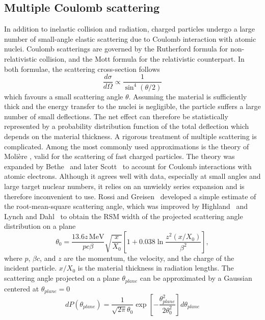 \subsection{Multiple Coulomb scattering}\label{subsect:multi-scat}

In addition to inelastic collision and radiation, charged particles undergo a large number of small-angle elastic scattering due to Coulomb interaction with atomic nuclei. 
Coulomb scatterings are governed by the Rutherford formula for non-relativistic collision, and the Mott formula for the relativistic counterpart. 
In both formulae, the scattering cross-section follows 
\begin{equation}
    \label{eq:6.13}
    \frac{d\sigma}{d\Omega} \propto \frac{1}{\sin^4 (\theta/2)}
\end{equation}
which favours a small scattering angle $\theta$. Assuming the material is sufficiently thick and the energy transfer to the nuclei is negligible, the particle suffers a large number of small deflections.
The net effect can therefore be statistically represented by a probability distribution function of the total deflection which depends on the material thickness. 
A rigorous treatment of multiple scattering is complicated. 
Among the most commonly used approximations is the theory of Molière \cite{Moliere:1947, Moliere:1948zz}, valid for the scattering of fast charged particles. 
The theory was expanded by Bethe~\cite{bethe:1953} and later Scott~\cite{scott:1963} to account for Coulomb interactions with atomic electrons. 
Although it agrees well with data, especially at small angles and large target nuclear numbers, it relies on an unwieldy series expansion and is therefore inconvenient to use. 
Rossi and Greisen~\cite{Rossi_Greisen_1941} developed a simple estimate of the root-mean-square scattering angle, which was improved by Highland~\cite{Highland_1975} and Lynch and Dahl~\cite{Lynch_Dahl_1991} to obtain the RSM width of the projected scattering angle distribution on a plane
\begin{equation}
\label{eq:6.14}
    \theta_0 = \frac{13.6z\, \mathrm{MeV}}{pc\beta} \sqrt{\frac{x}{X_0}}\left[ 1 + 0.038\ln \frac{z^2(x/X_0)}{\beta^2} \right],
\end{equation}
where $p$, $\beta c$, and $z$ are the momentum, the velocity, and the charge of the incident particle. $x/X_0$ is the material thickness in radiation lengths. 
The scattering angle projected on a plane $\theta_{plane}$ can be approximated by a Gaussian centered at $\theta_{plane}=0$
\begin{equation}
    \label{eq:6.15}
    d P(\theta_{plane}) = \frac{1}{\sqrt{2\pi} \theta_0} \exp \left[ - \frac{\theta_{plane}^2}{2\theta_0^2} \right] d\theta_{plane}
\end{equation}
